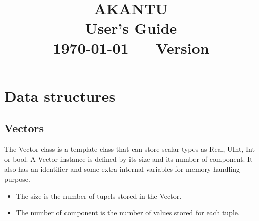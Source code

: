 \documentclass[a4paper,11pt]{book}
\title{\textbf{\Huge AKANTU}\\
  \vspace{0.5cm}
  \textbf{\huge User's Guide}\\
  \vspace{1cm}
  {\small \today{} --- Version \version}
}
\date{}
\begin{document}
\maketitle

\tableofcontents

\chapter{Data structures\label{chap:data-structure}}

\section{Vectors\label{sec:vectors}}

The Vector class is a template class  that can store scalar types as Real, UInt,
Int  or bool.   A Vector  instance is  defined by  its size  and its  number of
component. It also has an identifier and some extra internal variables for memory
handling purpose.

\begin{itemize}
\item The size is the number of tupels stored in the Vector.
\item The number of component is the number of values stored for each tuple.
\end{itemize}
\end{document}
